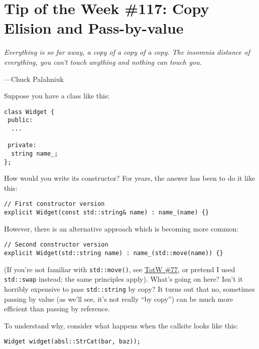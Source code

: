 
\chapter{Tip of the Week \#117: Copy Elision and Pass-by-value}\label{ch:tip-of-the-week-117}

\epigraph{\itshape Everything is so far away, a copy of a copy of a copy. The insomnia distance of everything, you can’t touch anything and nothing can touch you.}{---Chuck Palahniuk}

Suppose you have a class like this:
\begin{verbatim}
class Widget {
 public:
  ...

 private:
  string name_;
};
\end{verbatim}

How would you write its constructor? For years, the answer has been to do it like this:
\begin{verbatim}
// First constructor version
explicit Widget(const std::string& name) : name_(name) {}
\end{verbatim}

However, there is an alternative approach which is becoming more common:
\begin{verbatim}
// Second constructor version
explicit Widget(std::string name) : name_(std::move(name)) {}
\end{verbatim}

(If you’re not familiar with \texttt{std::move()}, see \hyperref[ch:tip-of-the-week-77]{TotW \#77}, or pretend I used \texttt{std::swap} instead; the same principles apply). What’s going on here? Isn’t it horribly expensive to pass \texttt{std::string} by copy? It turns out that no, sometimes passing by value (as we’ll see, it’s not really \enquote{by copy}) can be much more efficient than passing by reference.

To understand why, consider what happens when the callsite looks like this:
\begin{verbatim}
Widget widget(absl::StrCat(bar, baz));
\end{verbatim}

